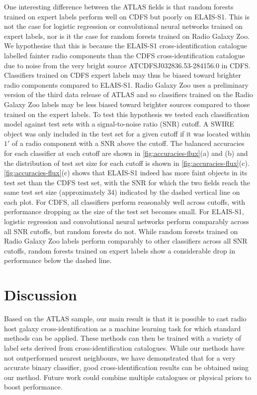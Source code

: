 \documentclass[11pt, a4paper]{book}
\begin{document}
  One interesting difference between the ATLAS fields is that random forests
  trained on expert labels perform well on CDFS but poorly on ELAIS-S1. This
  is not the case for logistic regression or convolutional neural networks
  trained on expert labels, nor is it the case for random forests trained on
  Radio Galaxy Zoo. We hypothesise that this is because the ELAIS-S1
  cross-identification catalogue \citep{middelberg08} labelled fainter radio
  components than the CDFS cross-identification catalogue \citep{norris06} due
  to noise from the very bright source
  ATCDFS\textunderscore{}J032836.53-284156.0 in CDFS. Classifiers trained on
  CDFS expert labels may thus be biased toward brighter radio components
  compared to ELAIS-S1. Radio Galaxy Zoo uses a preliminary version of the third data release of ATLAS
  \citep{franzen15} and so classifiers trained on the Radio Galaxy Zoo labels
  may be less biased toward brighter sources compared to those trained on the
  expert labels. To test this hypothesis we tested each classification model against
  test sets with a signal-to-noise ratio (SNR) cutoff. A SWIRE object was only
  included in the test set for a given cutoff if it was located within $1'$ of
  a radio component with a SNR above the cutoff. The balanced accuracies for
  each classifier at each cutoff are shown in \autoref{fig:accuracies-flux}(a)
  and (b) and the distribution of test set size for each cutoff is shown in
  \autoref{fig:accuracies-flux}(c). \autoref{fig:accuracies-flux}(c) shows
  that ELAIS-S1 indeed has more faint objects in its test set than the CDFS test set, with the SNR for
  which the two fields reach the same test set size (approximately $34$)
  indicated by the dashed vertical line on each plot. For CDFS, all
  classifiers perform reasonably well across cutoffs, with performance
  dropping as the size of the test set becomes small. For ELAIS-S1, logistic
  regression and convolutional neural networks perform comparably across all
  SNR cutoffs, but random forests do not. While random forests trained on
  Radio Galaxy Zoo labels perform comparably to other classifiers across all
  SNR cutoffs, random forests trained on expert labels show a considerable
  drop in performance below the dashed line.

\section{Discussion}

  {Based on the ATLAS sample}, our main result is that it is possible
  to cast radio host galaxy cross-identification as a machine learning task
  for which standard methods can be applied. These methods can then be trained
  with a variety of label sets derived from cross-identification catalogues.
  While our methods have not outperformed nearest neighbours, we have demonstrated that
  for a very accurate binary classifier, good cross-identification results can
  be obtained using our method. Future work could combine multiple catalogues
  or physical priors to boost performance.
\end{document}
